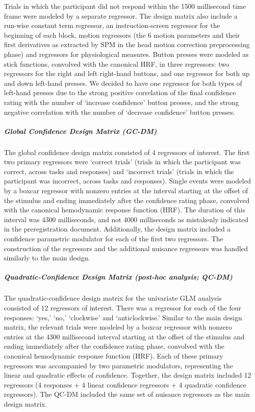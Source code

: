 \documentclass[12pt,twoside]{reedthesis}
\begin{document}
Trials in which the participant did not respond within the 1500 millisecond time frame were modeled by a separate regressor. The design matrix also include a run-wise constant term regressor, an instruction-screen regressor for the beginning of each block, motion regressors (the 6 motion parameters and their first derivatives as extracted by SPM in the head motion correction preprocessing phase) and regressors for physiological measures. Button presses were modeled as stick functions, convolved with the canonical HRF, in three regressors: two regressors for the right and left right-hand buttons, and one regressor for both up and down left-hand presses. We decided to have one regressor for both types of left-hand presses due to the strong positive correlation of the final confidence rating with the number of `increase confidence' button presses, and the strong negative correlation with the number of `decrease confidence' button presses.

\hypertarget{global-confidence-design-matrix-gc-dm}{%
\subparagraph*{Global Confidence Design Matrix (GC-DM)}\label{global-confidence-design-matrix-gc-dm}}

The global confidence design matrix consisted of 4 regressors of interest. The first two primary regressors were `correct trials' (trials in which the participant was correct, across tasks and responses) and `incorrect trials' (trials in which the participant was incorrect, across tasks and responses). Single events were modeled by a boxcar regressor with nonzero entries at the interval starting at the offset of the stimulus and ending immediately after the confidence rating phase, convolved with the canonical hemodynamic response function (HRF). The duration of this interval was 4300 milliseconds, and not 4000 milliseconds as mistakenly indicated in the preregistration document. Additionally, the design matrix included a confidence parametric modulator for each of the first two regressors. The construction of the regressors and the additional nuisance regressors was handled similarly to the main design.

\hypertarget{QC-DM}{%
\subparagraph*{Quadratic-Confidence Design Matrix (post-hoc analysis; QC-DM)}\label{QC-DM}}

The quadratic-confidence design matrix for the univariate GLM analysis consisted of 12 regressors of interest. There was a regressor for each of the four responses: `yes,' `no,' `clockwise' and `anticlockwise.' Similar to the main design matrix, the relevant trials were modeled by a boxcar regressor with nonzero entries at the 4300 millisecond interval starting at the offset of the stimulus and ending immediately after the confidence rating phase, convolved with the canonical hemodynamic response function (HRF).
Each of these primary regressors was accompanied by two parametric modulators, representing the linear and quadratic effects of confidence. Together, the design matrix included 12 regressors (4 responses + 4 linear confidence regressors + 4 quadratic confidence regressors). The QC-DM included the same set of nuisance regressors as the main design matrix.
\end{document}
